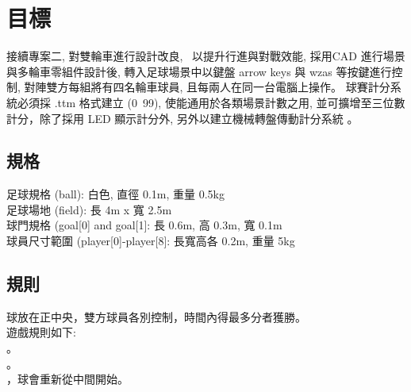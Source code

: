 \chapter{目標}
接續專案二, 對雙輪車進行設計改良,  以提升行進與對戰效能, 採用CAD 進行場景與多輪車零組件設計後, 轉入足球場景中以鍵盤 arrow keys 與 wzas 等按鍵進行控制, 對陣雙方每組將有四名輪車球員, 且每兩人在同一台電腦上操作。
球賽計分系統必須採 .ttm 格式建立 (0~99), 使能通用於各類場景計數之用, 並可擴增至三位數計分，除了採用 LED 顯示計分外, 另外以建立機械轉盤傳動計分系統 。

\section{規格}
足球規格 (ball): 白色, 直徑 0.1m, 重量 0.5kg \\
足球場地 (field): 長 4m x 寬 2.5m \\
球門規格 (goal[0] and goal[1]: 長 0.6m, 高 0.3m, 寬 0.1m \\
球員尺寸範圍 (player[0]-player[8]: 長寬高各 0.2m, 重量 5kg \\

\section{規則}
球放在正中央，雙方球員各別控制，時間內得最多分者獲勝。 \\

遊戲規則如下: \\
。 \\
。 \\
，球會重新從中間開始。 \\
